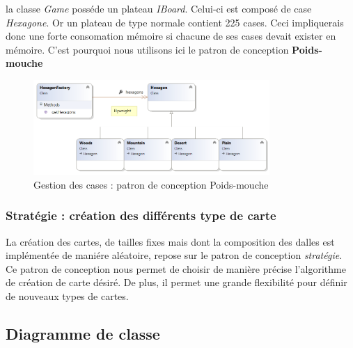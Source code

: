		la classe \emph{Game} posséde un plateau \emph{IBoard}. Celui-ci est composé de case \emph{Hexagone}. Or un plateau de type normale contient 225 cases. Ceci impliquerais donc une forte consomation mémoire si chacune de ses cases devait exister en mémoire. C'est pourquoi nous utilisons ici le patron de conception \textbf{Poids-mouche}
		\begin{figure}
			\begin{center}
				\includegraphics[width=0.8\textwidth]{figure/flyweight}
			\end{center}
			\caption{Gestion des cases : patron de conception Poids-mouche}
			\label{fig:planif}
		\end{figure}

		\subsubsection{Stratégie : création des différents type de carte}



		La création des cartes, de tailles fixes mais dont la composition des dalles est implémentée de maniére aléatoire, repose sur le patron de conception \emph{stratégie}. Ce patron de conception nous permet de choisir de manière précise l'algorithme de création de carte désiré. De plus, il permet une grande flexibilité pour définir de nouveaux types de cartes.



	\subsection{Diagramme de classe}


